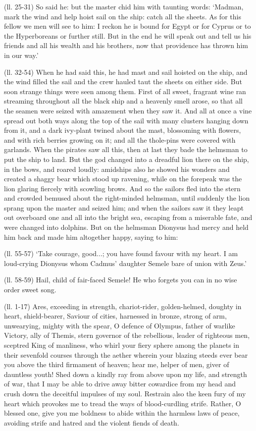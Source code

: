 (ll. 25-31) So said he: but the master chid him with taunting words:
‘Madman, mark the wind and help hoist sail on the ship: catch all the
sheets. As for this fellow we men will see to him: I reckon he is bound for
Egypt or for Cyprus or to the Hyperboreans or further still. But in the end he
will speak out and tell us his friends and all his wealth and his brothers, now
that providence has thrown him in our way.’

(ll. 32-54) When he had said this, he had mast and sail hoisted on the ship,
and the wind filled the sail and the crew hauled taut the sheets on either
side. But soon strange things were seen among them. First of all sweet,
fragrant wine ran streaming throughout all the black ship and a heavenly smell
arose, so that all the seamen were seized with amazement when they saw it. And
all at once a vine spread out both ways along the top of the sail with many
clusters hanging down from it, and a dark ivy-plant twined about the mast,
blossoming with flowers, and with rich berries growing on it; and all the
thole-pins were covered with garlands. When the pirates saw all this, then at
last they bade the helmsman to put the ship to land. But the god changed into a
dreadful lion there on the ship, in the bows, and roared loudly: amidships also
he showed his wonders and created a shaggy bear which stood up ravening, while
on the forepeak was the lion glaring fiercely with scowling brows. And so the
sailors fled into the stern and crowded bemused about the right-minded
helmsman, until suddenly the lion sprang upon the master and seized him; and
when the sailors saw it they leapt out overboard one and all into the bright
sea, escaping from a miserable fate, and were changed into dolphins. But on the
helmsman Dionysus had mercy and held him back and made him altogether happy,
saying to him:

(ll. 55-57) ‘Take courage, good...; you have found favour with my heart.
I am loud-crying Dionysus whom Cadmus’ daughter Semele bare of union with
Zeus.’

(ll. 58-59) Hail, child of fair-faced Semele! He who forgets you can in no wise
order sweet song.


(ll. 1-17) Ares, exceeding in strength, chariot-rider, golden-helmed, doughty
in heart, shield-bearer, Saviour of cities, harnessed in bronze, strong of arm,
unwearying, mighty with the spear, O defence of Olympus, father of warlike
Victory, ally of Themis, stern governor of the rebellious, leader of righteous
men, sceptred King of manliness, who whirl your fiery sphere among the planets
in their sevenfold courses through the aether wherein your blazing steeds ever
bear you above the third firmament of heaven; hear me, helper of men, giver of
dauntless youth! Shed down a kindly ray from above upon my life, and strength
of war, that I may be able to drive away bitter cowardice from my head and
crush down the deceitful impulses of my soul. Restrain also the keen fury of my
heart which provokes me to tread the ways of blood-curdling strife. Rather, O
blessed one, give you me boldness to abide within the harmless laws of peace,
avoiding strife and hatred and the violent fiends of death.

